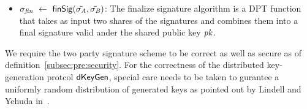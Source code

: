 \begin{definition}
\begin{itemize}
        \item $\sigma_{\mathit{fin}} ~\leftarrow~ \mathsf{finSig}(\tilde{\sigma_{\mathit{A}}}, \tilde{\sigma_{\mathit{B}}})$: The finalize signature algorithm is a DPT function that takes as input two shares of the signatures and combines them into a final signature valid ander the shared public key $\mathit{pk}$.

    \end{itemize}

\end{definition}

We require the two party signature scheme to be correct as well as secure as of definition~\ref{subsec:pre:security}.
For the correctness of the distributed key-generation protcol $\mathsf{dKeyGen}$, special care needs to be taken to gurantee a uniformly random distribution of generated keys as pointed out by Lindell and Yehuda in~\cite{lindell2017fast}.

